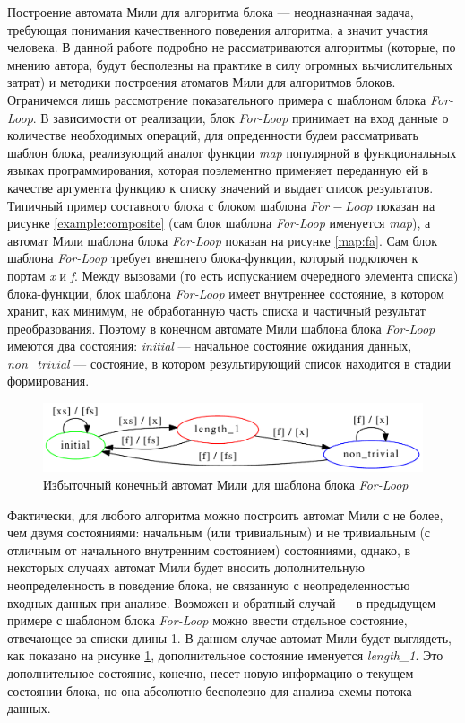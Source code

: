 \documentclass[10pt,a4paper]{article}
\begin{document}
Построение автомата Мили для алгоритма блока --- неодназначная задача, требующая понимания качественного поведения алгоритма, а значит участия человека. В данной работе подробно не рассматриваются алгоритмы (которые, по мнению автора, будут бесполезны на практике в силу огромных вычислительных затрат) и методики построения атоматов Мили для алгоритмов блоков. Ограничемся лишь рассмотрение показательного примера с шаблоном блока \textit{For-Loop}. В зависимости от реализации, блок \textit{For-Loop} принимает на вход данные о количестве необходимых операций, для опреденности будем рассматривать шаблон блока, реализующий аналог функции \textit{map} популярной в функциональных языках программирования,
которая поэлементно применяет переданную ей в качестве аргумента функцию к списку значений и выдает список результатов. Типичный пример составного блока с блоком шаблона $For-Loop$ показан на рисунке \ref{example:composite} (сам блок шаблона \textit{For-Loop} именуется \textit{map}), а автомат Мили шаблона блока \textit{For-Loop}
показан на рисунке \ref{map:fa}. Сам блок шаблона \textit{For-Loop} требует внешнего блока-функции, который подключен к портам \textit{x} и \textit{f}.
Между вызовами (то есть испусканием очередного элемента списка) блока-функции, блок шаблона \textit{For-Loop} имеет внутреннее состояние, в котором хранит, как минимум,
не обработанную часть списка и частичный результат преобразования. Поэтому в конечном автомате Мили шаблона блока \textit{For-Loop} имеются два состояния:
\textit{initial} --- начальное состояние ожидания данных, \textit{non\_trivial} --- состояние, в котором результирующий список находится в стадии формирования.

\begin{figure}
    \centering
    \includegraphics[width=\textwidth]{map_extra_fa.pdf}
    \caption{Избыточный конечный автомат Мили для шаблона блока \textit{For-Loop}}
    \label{map:extra_fa}
\end{figure}

Фактически, для любого алгоритма можно построить автомат Мили с не более, чем двумя состояниями: начальным (или тривиальным) и не тривиальным (с отличным от начального внутренним
состоянием) состояниями, однако, в некоторых случаях автомат Мили будет вносить дополнительную неопределенность в поведение блока, не связанную с неопределенностью
входных данных при анализе. Возможен и обратный случай --- в предыдущем примере с шаблоном блока \textit{For-Loop} можно ввести отдельное состояние, отвечающее за списки длины 1.
В данном случае автомат Мили будет выглядеть, как показано на рисунке \ref{map:extra_fa}, дополнительное состояние именуется \textit{length\_1}. Это дополнительное состояние, конечно,
несет новую информацию о текущем состоянии блока, но она абсолютно бесполезно для анализа схемы потока данных.
\end{document}
